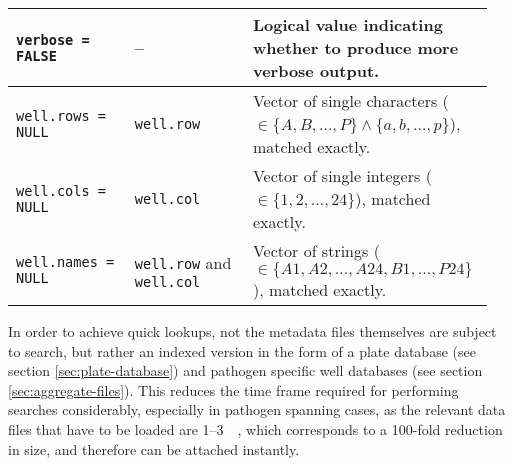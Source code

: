 \begin{table}
\begin{tabular}{L{0.25\linewidth}L{0.25\linewidth}L{0.45\linewidth}}
    \texttt{verbose = FALSE} &
      -- &
      Logical value indicating whether to produce more verbose output. \\
    \hline 
    \texttt{well.rows = NULL} &
      \texttt{well.row} &
      Vector of single characters ($\in \{ A, B, \dotsc, P \} \land \allowbreak \{ a, b, \dotsc, p \}$), matched exactly. \\
    \texttt{well.cols = NULL} &
      \texttt{well.col} &
      Vector of single integers ($\in \{ 1, 2, \dotsc, 24 \}$), matched exactly. \\
    \texttt{well.names = NULL} &
      \texttt{well.row} and \texttt{well.col} &
      Vector of strings ($\in \{ A1, A2, \dotsc, A24, B1, \dotsc, \allowbreak P24 \}$), matched exactly. \\
    \hline 
  \end{tabular}
\end{table}

In order to achieve quick lookups, not the metadata files themselves are subject to search, but rather an indexed version in the form of a plate database (see section \ref{sec:plate-database}) and pathogen specific well databases (see section \ref{sec:aggregate-files}). This reduces the time frame required for performing searches considerably, especially in pathogen spanning cases, as the relevant data files that have to be loaded are 1--\SI{3}{\mega\byte}, which corresponds to a 100-fold reduction in size, and therefore can be attached instantly.